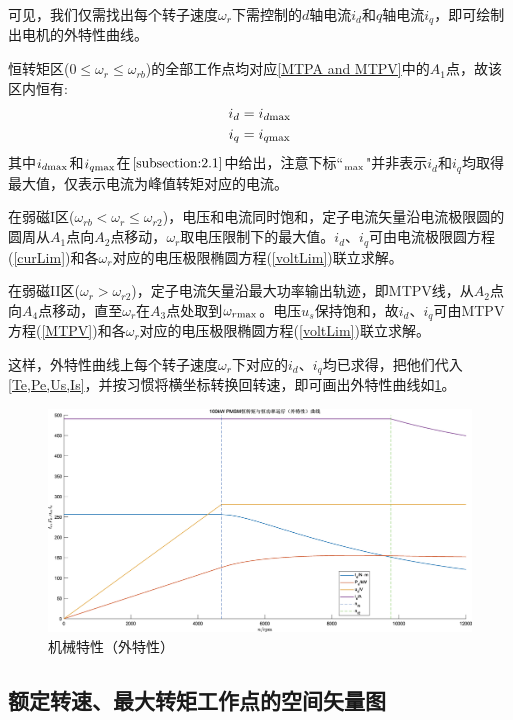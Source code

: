 \documentclass[UTF8]{ctexart}
\numberwithin{figure}{section}
\numberwithin{table}{section}
\begin{document}
可见，我们仅需找出每个转子速度$\omega_r$下需控制的$d$轴电流$i_d$和$q$轴电流$i_q$，即可绘制出电机的外特性曲线。

恒转矩区($0\le\omega_r\le\omega_{rb}$)的全部工作点均对应\cref{MTPA and MTPV}中的$A_1$点，故该区内恒有:
\begin{align}
	i_d & =i_{d\rm max} \\
	i_q & =i_{q\rm max}
\end{align}
其中$i_{d\rm max}$和$i_{q\rm max}$在$\cref{subsection:2.1}$中给出，注意下标``$_{\rm max}$"并非表示$i_d$和$i_q$均取得最大值，仅表示电流为峰值转矩对应的电流。

在弱磁I区($\omega_{rb}<\omega_r\le\omega_{r2}$)，电压和电流同时饱和，定子电流矢量沿电流极限圆的圆周从$A_1$点向$A_2$点移动，$\omega_r$取电压限制下的最大值。$i_d$、$i_q$可由电流极限圆方程(\cref{curLim})和各$\omega_r$对应的电压极限椭圆方程(\cref{voltLim})联立求解。

在弱磁II区($\omega_r>\omega_{r2}$)，定子电流矢量沿最大功率输出轨迹，即MTPV线，从$A_2$点向$A_4$点移动，直至$\omega_r$在$A_3$点处取到$\omega_{r\rm max}$。电压$u_s$保持饱和，故$i_d$、$i_q$可由MTPV方程(\cref{MTPV})和各$\omega_r$对应的电压极限椭圆方程(\cref{voltLim})联立求解。

这样，外特性曲线上每个转子速度$\omega_r$下对应的$i_d$、$i_q$均已求得，把他们代入\cref{Te,Pe,Us,Is}，并按习惯将横坐标转换回转速，即可画出外特性曲线如\cref{extChar}。

\begin{figure}[htbp]
	\centering
	\includegraphics[width=1\textwidth]{6}
	\caption{机械特性（外特性）}
	\label{extChar}
\end{figure}

\subsection{额定转速、最大转矩工作点的空间矢量图}
\label{subsection:2.7}
\end{document}
